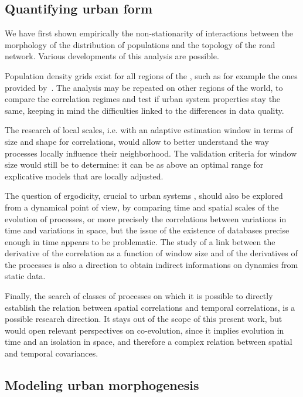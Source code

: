 \subsection{Quantifying urban form}

We have first shown empirically the non-stationarity of interactions between the morphology of the distribution of populations and the topology of the road network. Various developments of this analysis are possible.

Population density grids exist for all regions of the , such as for example the ones provided by~\cite{10.1371/journal.pone.0107042}. The analysis may be repeated on other regions of the world, to compare the correlation regimes and test if urban system properties stay the same, keeping in mind the difficulties linked to the differences in data quality.

The research of local scales, i.e. with an adaptive estimation window in terms of size and shape for correlations, would allow to better understand the way processes locally influence their neighborhood. The validation criteria for window size would still be to determine: it can be as above an optimal range for explicative models that are locally adjusted.

The question of ergodicity, crucial to urban systems \citep{pumain2012urban}, should also be explored from a dynamical point of view, by comparing time and spatial scales of the evolution of processes, or more precisely the correlations between variations in time and variations in space, but the issue of the existence of databases precise enough in time appears to be problematic. The study of a link between the derivative of the correlation as a function of window size and of the derivatives of the processes is also a direction to obtain indirect informations on dynamics from static data.


Finally, the search of classes of processes on which it is possible to directly establish the relation between spatial correlations and temporal correlations, is a possible research direction. It stays out of the scope of this present work, but would open relevant perspectives on co-evolution, since it implies evolution in time and an isolation in space, and therefore a complex relation between spatial and temporal covariances.

\subsection{Modeling urban morphogenesis}

